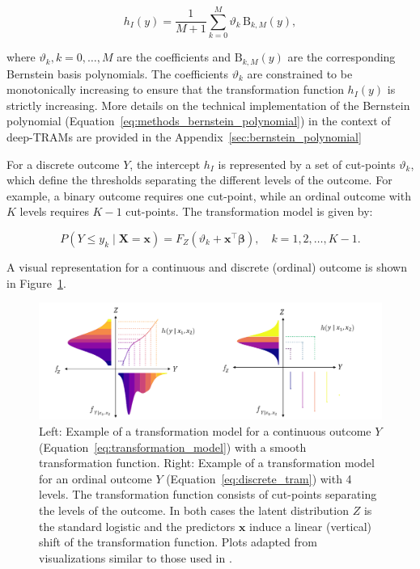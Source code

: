 \begin{equation}
h_I(y) = \frac{1}{M + 1} \sum_{k=0}^{M} \vartheta_k \, \text{B}_{k, M}(y),
\label{eq:methods_bernstein_polynomial}
\end{equation}

where $\vartheta_k, k = 0, \ldots, M$ are the coefficients and $\text{B}_{k, M}(y)$ are the corresponding Bernstein basis polynomials. The coefficients $\vartheta_k$ are constrained to be monotonically increasing to ensure that the transformation function $h_I(y)$ is strictly increasing. More details on the technical implementation of the Bernstein polynomial (Equation~\ref{eq:methods_bernstein_polynomial}) in the context of deep-TRAMs are provided in the Appendix~\ref{sec:bernstein_polynomial}






For a discrete outcome $Y$, the intercept $h_I$ is represented by a set of cut-points $\vartheta_k$, which define the thresholds separating the different levels of the outcome. For example, a binary outcome requires one cut-point, while an ordinal outcome with $K$ levels requires $K-1$ cut-points. The transformation model is given by:

\begin{equation}
P(Y \leq y_k \mid \mathbf{X} = \mathbf{x}) = F_Z(\vartheta_k + \mathbf{x}^\top \boldsymbol{\beta}), \quad k = 1, 2, \ldots, K - 1.
\label{eq:discrete_tram}
\end{equation}


A visual representation for a continuous and discrete (ordinal) outcome is shown in Figure~\ref{fig:tram_cont_ord}.


\begin{figure}[H]
\centering
\includegraphics[width=1\textwidth]{img/tram_cont_ord.png}
\caption{Left: Example of a transformation model for a continuous outcome $Y$ (Equation~\ref{eq:transformation_model}) with a smooth transformation function. Right: Example of a transformation model for an ordinal outcome $Y$ (Equation~\ref{eq:discrete_tram}) with 4 levels. The transformation function consists of cut-points separating the levels of the outcome.
In both cases the latent distribution $Z$ is the standard logistic and the predictors $\mathbf{x}$ induce a linear (vertical) shift of the transformation function. Plots adapted from visualizations similar to those used in \citet{sick2025}.}
\label{fig:tram_cont_ord}
\end{figure}


